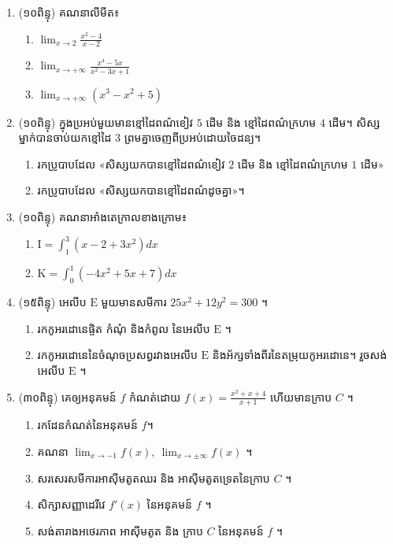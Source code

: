 \documentclass{officialexam}
\begin{document}
\newpage
\maketitle
{}
    \begin{enumerate}[I]
\item (១០ពិន្ទុ)  គណនាលីមីត៖

\begin{enumerate}[k,3]
\item  $\lim_{x\to 2}\frac{x^2-4}{x-2}$
\item  $\lim_{x\to +\infty}\frac{x^4-5x}{x^2-3x+1}$
\item  $\lim_{x\to +\infty}\left(x^3-x^2+5\right)$
\end{enumerate}
\item (១០ពិន្ទុ)  ក្នុងប្រអប់មួយមានខ្មៅដៃពណ៌ខៀវ $5$ ដើម និង ខ្មៅដៃពណ៌ក្រហម $4$ ដើម។ សិស្សម្នាក់បានចាប់យកខ្មៅដៃ $3$ ព្រមគ្នាចេញពីប្រអប់ដោយចៃដន្យ។ 
			\begin{enumerate}[k]
			\item រកប្រូបាបដែល «សិស្សយកបានខ្មៅដៃពណ៌ខៀវ $2$ ដើម និង ខ្មៅដៃពណ៌ក្រហម $1$ ដើម»
			\item រកប្រូបាបដែល «សិស្សយកបានខ្មៅដៃពណ៌ដូចគ្នា»។
			\end{enumerate}
	\item (១០ពិន្ទុ) គណនាអាំងតេក្រាលខាងក្រោម៖
\begin{enumerate}[label={} ,2]
\item  $\mathrm{I}=\int_1^3\left(x-2+3x^2\right)dx$
\item   
 $\mathrm{K}=\int_0^1\left( -4x^2+5x+7\right) dx$ 
\end{enumerate}	

\item (១៥ពិន្ទុ) 
 អេលីប $\mathrm{E}$ មួយមានសមីការ $25x^2+12y^2=300$ ។
\begin{enumerate}[k]
\item រកកូអរដោនេផ្ចិត កំណុំ និងកំពូល នៃអេលីប $\mathrm{E}$ ។ 
\item រកកូអរដោនេនៃចំណុចប្រសព្វរវាងអេលីប $\mathrm{E}$ និងអ័ក្សទាំងពីរនៃតម្រុយកូអរដោនេ។ រួចសង់អេលីប $\mathrm{E}$ ។
\end{enumerate}
\item (៣០ពិន្ទុ)  គេឲ្យអនុគមន៍ $f$ កំណត់ដោយ $f(x)=\frac{x^2+x+4}{x+1}$ ហើយមានក្រាប $C$ ។
\begin{enumerate}[k]
\item រកដែនកំណត់នៃអនុគមន៍ $f$។ 
\item គណនា $\lim_{x\to -1}f(x),\ \lim_{x\to \pm\infty}f(x)$ ។
\item សរសេរសមីការអាស៊ីមតូតឈរ និង អាស៊ីមតូតទ្រេតនៃក្រាប $C$ ។
\item  សិក្សាសញ្ញាដេរីវេ $f'(x)$ នៃអនុគមន៍ $f$ ។
\item សង់តារាងអថេរភាព អាស៊ីមតូត និង ក្រាប $C$ នៃអនុគមន៍ $f$ ។
\end{enumerate}
\end{enumerate}
\end{document}
